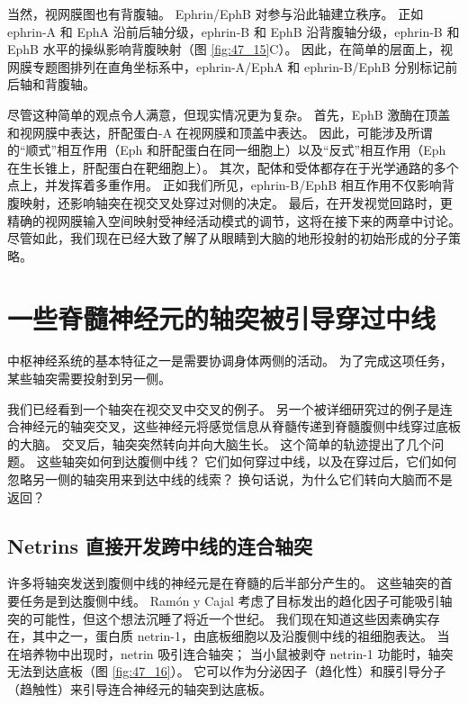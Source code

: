 当然，视网膜图也有背腹轴。 Ephrin/EphB 对参与沿此轴建立秩序。 正如 ephrin-A 和 EphA 沿前后轴分级，ephrin-B 和 EphB 沿背腹轴分级，ephrin-B 和 EphB 水平的操纵影响背腹映射（图 \ref{fig:47_15}C）。 因此，在简单的层面上，视网膜专题图排列在直角坐标系中，ephrin-A/EphA 和 ephrin-B/EphB 分别标记前后轴和背腹轴。

尽管这种简单的观点令人满意，但现实情况更为复杂。 首先，EphB 激酶在顶盖和视网膜中表达，肝配蛋白-A 在视网膜和顶盖中表达。 因此，可能涉及所谓的“顺式”相互作用（Eph 和肝配蛋白在同一细胞上）以及“反式”相互作用（Eph 在生长锥上，肝配蛋白在靶细胞上）。 其次，配体和受体都存在于光学通路的多个点上，并发挥着多重作用。 正如我们所见，ephrin-B/EphB 相互作用不仅影响背腹映射，还影响轴突在视交叉处穿过对侧的决定。 最后，在开发视觉回路时，更精确的视网膜输入空间映射受神经活动模式的调节，这将在接下来的两章中讨论。 尽管如此，我们现在已经大致了解了从眼睛到大脑的地形投射的初始形成的分子策略。


\section{一些脊髓神经元的轴突被引导穿过中线}
中枢神经系统的基本特征之一是需要协调身体两侧的活动。 为了完成这项任务，某些轴突需要投射到另一侧。

我们已经看到一个轴突在视交叉中交叉的例子。 另一个被详细研究过的例子是连合神经元的轴突交叉，这些神经元将感觉信息从脊髓传递到脊髓腹侧中线穿过底板的大脑。 交叉后，轴突突然转向并向大脑生长。 这个简单的轨迹提出了几个问题。 这些轴突如何到达腹侧中线？ 它们如何穿过中线，以及在穿过后，它们如何忽略另一侧的轴突用来到达中线的线索？ 换句话说，为什么它们转向大脑而不是返回？

\subsection{Netrins 直接开发跨中线的连合轴突}
许多将轴突发送到腹侧中线的神经元是在脊髓的后半部分产生的。 这些轴突的首要任务是到达腹侧中线。 Ramón y Cajal 考虑了目标发出的趋化因子可能吸引轴突的可能性，但这个想法沉睡了将近一个世纪。 我们现在知道这些因素确实存在，其中之一，蛋白质 netrin-1，由底板细胞以及沿腹侧中线的祖细胞表达。 当在培养物中出现时，netrin 吸引连合轴突； 
当小鼠被剥夺 netrin-1 功能时，轴突无法到达底板（图 \ref{fig:47_16}）。 
它可以作为分泌因子（趋化性）和膜引导分子（趋触性）来引导连合神经元的轴突到达底板。

